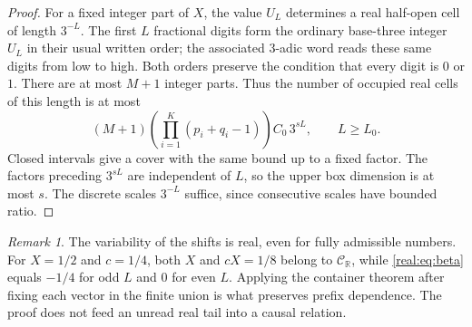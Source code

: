 \documentclass[11pt]{article}
\theoremstyle{definition}
\theoremstyle{remark}
\newtheorem{remark}[theorem]{Remark}
\newcommand{\R}{\mathbb R}
\newcommand{\CR}{\mathcal C_{\R}}
\begin{document}
\begin{proof}
For a fixed integer part of $X$, the value $U_L$ determines a real
half-open cell of length $3^{-L}$. The first $L$ fractional digits form
the ordinary base-three integer $U_L$ in their usual written order;
the associated 3-adic word reads these same digits from low to high.
Both orders preserve the condition that every digit is $0$ or $1$.
There are at most $M+1$ integer parts. Thus the
number of occupied real cells of this length is at most
\begin{equation}\label{real:eq:real-count}
 (M+1)\left(\prod_{i=1}^K(p_i+q_i-1)\right)C_0\,3^{sL},
 \qquad L\ge L_0.
\end{equation}
Closed intervals give a cover with the same bound up to a fixed factor.
The factors preceding $3^{sL}$ are independent of $L$, so the upper
box dimension is at most $s$. The discrete scales $3^{-L}$ suffice,
since consecutive scales have bounded ratio.
\end{proof}

\begin{remark}\label{real:rem:changing}
The variability of the shifts is real, even for fully admissible
numbers. For $X=1/2$ and $c=1/4$, both $X$ and $cX=1/8$ belong to
$\CR$, while \eqref{real:eq:beta} equals $-1/4$ for odd $L$ and $0$ for
even $L$. Applying the container theorem after fixing each vector in
the finite union is what preserves prefix dependence. The proof does
not feed an unread real tail into a causal relation.
\end{remark}
\end{document}
